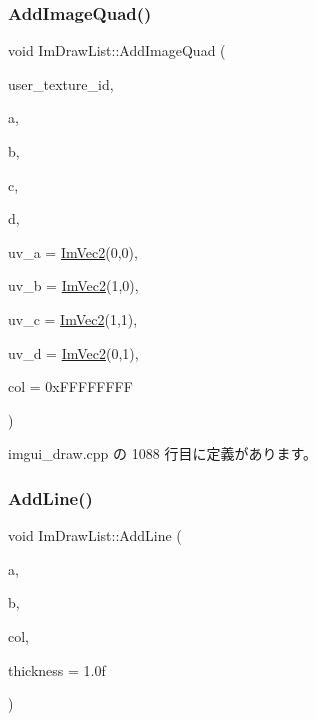 \subsubsection{\texorpdfstring{Add\+Image\+Quad()}{AddImageQuad()}}
{\footnotesize\ttfamily void Im\+Draw\+List\+::\+Add\+Image\+Quad (\begin{DoxyParamCaption}\item[{\mbox{\hyperlink{imgui_8h_a364f4447ecbc4ca176145ccff9db6286}{Im\+Texture\+ID}}}]{user\+\_\+texture\+\_\+id,  }\item[{const \mbox{\hyperlink{struct_im_vec2}{Im\+Vec2}} \&}]{a,  }\item[{const \mbox{\hyperlink{struct_im_vec2}{Im\+Vec2}} \&}]{b,  }\item[{const \mbox{\hyperlink{struct_im_vec2}{Im\+Vec2}} \&}]{c,  }\item[{const \mbox{\hyperlink{struct_im_vec2}{Im\+Vec2}} \&}]{d,  }\item[{const \mbox{\hyperlink{struct_im_vec2}{Im\+Vec2}} \&}]{uv\+\_\+a = {\ttfamily \mbox{\hyperlink{struct_im_vec2}{Im\+Vec2}}(0,0)},  }\item[{const \mbox{\hyperlink{struct_im_vec2}{Im\+Vec2}} \&}]{uv\+\_\+b = {\ttfamily \mbox{\hyperlink{struct_im_vec2}{Im\+Vec2}}(1,0)},  }\item[{const \mbox{\hyperlink{struct_im_vec2}{Im\+Vec2}} \&}]{uv\+\_\+c = {\ttfamily \mbox{\hyperlink{struct_im_vec2}{Im\+Vec2}}(1,1)},  }\item[{const \mbox{\hyperlink{struct_im_vec2}{Im\+Vec2}} \&}]{uv\+\_\+d = {\ttfamily \mbox{\hyperlink{struct_im_vec2}{Im\+Vec2}}(0,1)},  }\item[{\mbox{\hyperlink{imgui_8h_a118cff4eeb8d00e7d07ce3d6460eed36}{Im\+U32}}}]{col = {\ttfamily 0xFFFFFFFF} }\end{DoxyParamCaption})}



 imgui\+\_\+draw.\+cpp の 1088 行目に定義があります。

\mbox{\label{struct_im_draw_list_a6db76ca2506dc86ad4d602fdcd2e2ea8}} 
\subsubsection{\texorpdfstring{Add\+Line()}{AddLine()}}
{\footnotesize\ttfamily void Im\+Draw\+List\+::\+Add\+Line (\begin{DoxyParamCaption}\item[{const \mbox{\hyperlink{struct_im_vec2}{Im\+Vec2}} \&}]{a,  }\item[{const \mbox{\hyperlink{struct_im_vec2}{Im\+Vec2}} \&}]{b,  }\item[{\mbox{\hyperlink{imgui_8h_a118cff4eeb8d00e7d07ce3d6460eed36}{Im\+U32}}}]{col,  }\item[{float}]{thickness = {\ttfamily 1.0f} }\end{DoxyParamCaption})}



